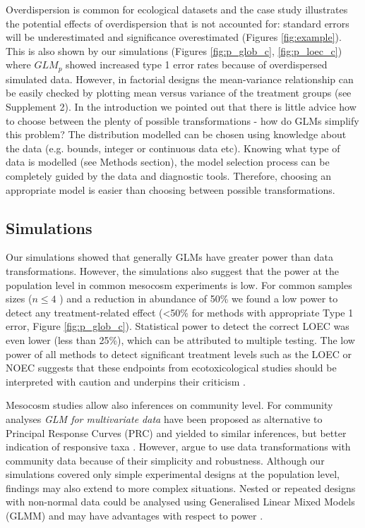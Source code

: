 \documentclass[twocolumn, natbib]{svjour3}
\begin{document}
Overdispersion is common for ecological datasets \citep{warton_many_2005} and the case study illustrates the potential effects of overdispersion that is not accounted for: standard errors will be underestimated and significance overestimated (Figures \ref{fig:example}).
This is also shown by our simulations (Figures \ref{fig:p_glob_c}, \ref{fig:p_loec_c}) where $GLM_p$ showed increased type 1 error rates because of overdispersed simulated data. 
However, in factorial designs the mean-variance relationship can be easily checked by plotting mean versus variance of the treatment groups (see Supplement 2).
In the introduction we pointed out that there is little advice how to choose between the plenty of possible transformations - how do GLMs simplify this problem?
The distribution modelled can be chosen using knowledge about the data (e.g. bounds, integer or continuous data etc).
Knowing what type of data is modelled (see Methods section), the model selection process can be completely guided by the data and diagnostic tools. Therefore, choosing an appropriate model is easier than choosing between possible transformations.


\subsection{Simulations}
Our simulations showed that generally GLMs have greater power than data transformations.
However, the simulations also suggest that the power at the population level in common mesocosm experiments is low.
For common samples sizes ($n \le 4$ ) and a reduction in abundance of 50\% we found a low power to detect any treatment-related effect (\textless 50\% for methods with appropriate Type 1 error, Figure \ref{fig:p_glob_c}).
Statistical power to detect the correct LOEC was even lower (less than 25\%), which can be attributed to multiple testing.
The low power of all methods to detect significant treatment levels such as the LOEC or NOEC suggests that these endpoints from ecotoxicological studies should be interpreted with caution and underpins their criticism \citep{laskowski_good_1995,landis_well_2011}.

Mesocosm studies allow also inferences on community level. 
For community analyses \emph{GLM for multivariate data} \citep{warton_distance-based_2012} have been proposed as alternative to Principal Response Curves (PRC) and yielded to similar inferences, but better indication of responsive taxa \citep{szocs_analysing_2015}. 
However, \citet{ter_braak_topics_2014} argue to use data transformations with community data because of their simplicity and robustness.
Although our simulations covered only simple experimental designs at the population level, findings may also extend to more complex situations. 
Nested or repeated designs with non-normal data could be analysed using Generalised Linear Mixed Models (GLMM) and may have advantages with respect to power \citep{stroup_rethinking_2014}.
\end{document}
